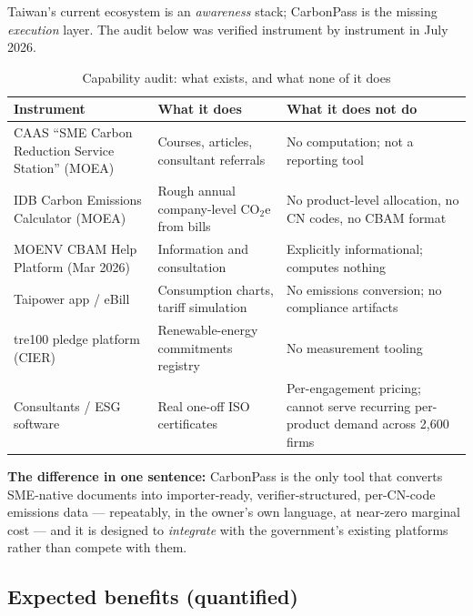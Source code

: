 Taiwan's current ecosystem is an \emph{awareness} stack; CarbonPass is the
missing \emph{execution} layer. The audit below was verified instrument by
instrument in July 2026.

\begin{table}[htbp]
\caption{Capability audit: what exists, and what none of it does}
\label{tab:gap}
\small
\begin{tabularx}{\textwidth}{@{}p{}p{}X@{}}
\toprule
\textbf{Instrument} & \textbf{What it does} & \textbf{What it does not do} \\
\midrule
CAAS ``SME Carbon Reduction Service Station'' (MOEA)\cite{caas} & Courses, articles, consultant referrals & No computation; not a reporting tool \\
IDB Carbon Emissions Calculator (MOEA)\cite{idb} & Rough annual company-level CO$_2$e from bills & No product-level allocation, no CN codes, no CBAM format \\
MOENV CBAM Help Platform (Mar 2026)\cite{tpt-cbam} & Information and consultation & Explicitly informational; computes nothing \\
Taipower app / eBill\cite{taipower} & Consumption charts, tariff simulation & No emissions conversion; no compliance artifacts \\
tre100 pledge platform (CIER)\cite{tre100} & Renewable-energy commitments registry & No measurement tooling \\
Consultants / ESG software\cite{chanchin} & Real one-off ISO certificates & Per-engagement pricing; cannot serve recurring per-product demand across 2,600 firms \\
\bottomrule
\end{tabularx}
\end{table}

\textbf{The difference in one sentence:} CarbonPass is the only tool that
converts SME-native documents into importer-ready, verifier-structured,
per-CN-code emissions data --- repeatably, in the owner's own language, at
near-zero marginal cost --- and it is designed to \emph{integrate} with the
government's existing platforms rather than compete with them.

\subsection{Expected benefits (quantified)}\label{sec:benefits}

